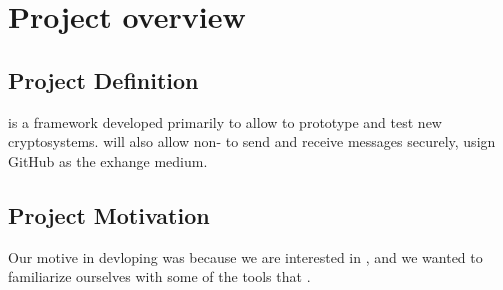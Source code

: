 \section{Project overview}


\subsection{Project Definition}
\cry{} is a framework developed primarily to allow
\cs{} to prototype and test new cryptosystems. \cry{} will
also allow non-\cs{} to send and receive messages
securely, usign GitHub as the exhange medium.

\subsection{Project Motivation}
Our motive in devloping \cry{} was because we are interested
in \cg{}, and we wanted to familiarize ourselves with
some of the tools that \cs{}.
